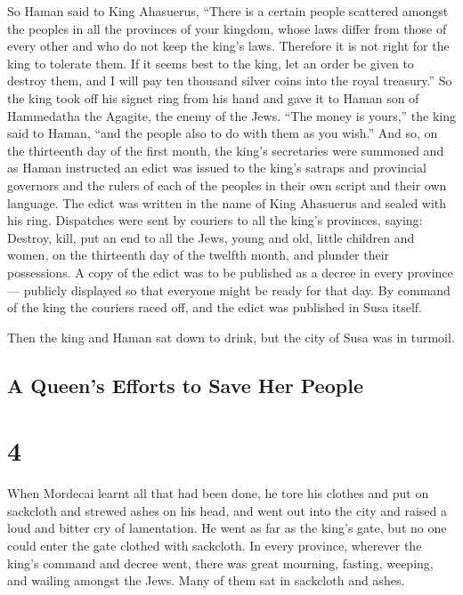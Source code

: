  So Haman said to King Ahasuerus, ``There is a certain
people scattered amongst the peoples in all the provinces of your
kingdom, whose laws differ from those of every other and who do not keep
the king's laws. Therefore it is not right for the king to tolerate
them.  If it seems best to the king, let an order be given
to destroy them, and I will pay ten thousand silver coins into the royal
treasury.''  So the king took off his signet ring from his
hand and gave it to Haman son of Hammedatha the Agagite, the enemy of
the Jews.  ``The money is yours,'' the king said to Haman,
``and the people also to do with them as you wish.''  And
so, on the thirteenth day of the first month, the king's secretaries
were summoned and as Haman instructed an edict was issued to the king's
satraps and provincial governors and the rulers of each of the peoples
in their own script and their own language. The edict was written in the
name of King Ahasuerus and sealed with his ring. 
Dispatches were sent by couriers to all the king's provinces, saying:
Destroy, kill, put an end to all the Jews, young and old, little
children and women, on the thirteenth day of the twelfth month, and
plunder their possessions.  A copy of the edict was to be
published as a decree in every province --- publicly displayed so that
everyone might be ready for that day.  By command of the
king the couriers raced off, and the edict was published in Susa itself.

Then the king and Haman sat down to drink, but the city of Susa was in
turmoil.

\hypertarget{a-queens-efforts-to-save-her-people}{%
\subsection{A Queen's Efforts to Save Her
People}\label{a-queens-efforts-to-save-her-people}}

\hypertarget{section-3}{%
\section{4}\label{section-3}}

 When Mordecai learnt all that had been done, he tore his
clothes and put on sackcloth and strewed ashes on his head, and went out
into the city and raised a loud and bitter cry of lamentation.
 He went as far as the king's gate, but no one could enter
the gate clothed with sackcloth.  In every province,
wherever the king's command and decree went, there was great mourning,
fasting, weeping, and wailing amongst the Jews. Many of them sat in
sackcloth and ashes.

